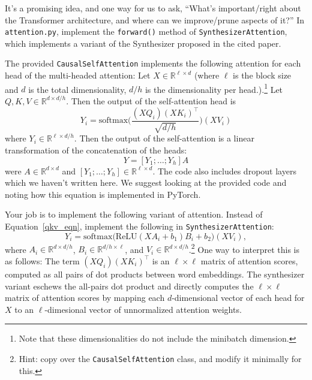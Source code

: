 \begin{enumerate}[(a)]
It's a promising idea, and one way for us to ask, ``What's important/right about the Transformer architecture, and where can we improve/prune aspects of it?''
In \texttt{attention.py}, implement the \texttt{forward()} method of \texttt{SynthesizerAttention}, which implements a variant of the Synthesizer proposed in the cited paper.

The provided \texttt{CausalSelfAttention} implements the following attention for each head of the multi-headed attention:
Let $X\in \mathbb{R}^{\ell \times d}$ (where $\ell$ is the block size and $d$ is the total dimensionality, $d/h$ is the dimensionality per head.).\footnote{Note that these dimensionalities do not include the minibatch dimension.}
Let $Q,K,V \in \mathbb{R}^{d\times d/h}$.
Then the output of the self-attention head is 
\begin{equation} \label{qkv_eqn}
Y_i = \text{softmax}\bigg(\frac{(XQ_i)(XK_i)^\top}{\sqrt{d/h}}\bigg)(XV_i)
\end{equation}
where $Y_i\in\mathbb{R}^{\ell \times d/h}$.
Then the output of the self-attention is a linear transformation of the concatenation of the heads:
\begin{equation}
Y = [Y_1;\dots;Y_h]A
\end{equation}
were $A \in\mathbb{R}^{d\times d}$ and $[Y_1;\dots;Y_h]\in\mathbb{R}^{\ell \times d}$.
The code also includes dropout layers which we haven't written here.
We suggest looking at the provided code and noting how this equation is implemented in PyTorch.

Your job is to implement the following variant of attention. Instead of Equation~\ref{qkv_eqn}, implement the following in \texttt{SynthesizerAttention}:
\begin{equation} 
Y_i = \text{softmax}\big(\text{ReLU}(XA_i+b_1)B_i + b_2 \big)(XV_i),
\end{equation}
where $A_i\in\mathbb{R}^{d \times d/h}$, $B_i\in\mathbb{R}^{d/h\times \ell}$, and $V_i\in\mathbb{R}^{d\times d/h}$.\footnote{Hint: copy over the \texttt{CausalSelfAttention} class, and modify it minimally for this.}
One way to interpret this is as follows: The term $(XQ_i)(XK_i)^\top$ is an $\ell \times \ell$ matrix of attention scores, computed as all pairs of dot products between word embeddings.
The synthesizer variant eschews the all-pairs dot product and directly computes the $\ell \times \ell$ matrix of attention scores by mapping each $d$-dimensional vector of each head for $X$ to an $\ell$-dimesional vector of unnormalized attention weights.


\end{enumerate}
